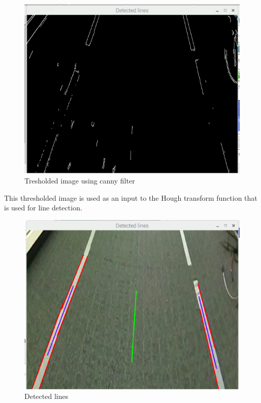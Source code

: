 \begin{figure}[H]
  \includegraphics[width=\textwidth]{./img/edges.png}
  \centering
  \caption{Tresholded image using canny filter}
  \label{fig:Tresholded image using canny filter}
\end{figure}

This thresholded image is used as an input to the Hough transform function that is used for line detection.


\begin{figure}[H]
  \includegraphics[width=\textwidth]{./img/detected_lines.png}
  \centering
  \caption{Detected lines}
  \label{fig:Detected lines}
\end{figure}

